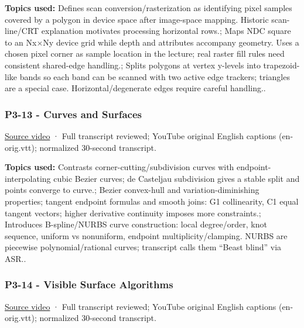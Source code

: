 \textbf{Topics used:} Defines scan conversion/rasterization as identifying pixel samples covered by a polygon in device space after image-space mapping. Historic scan-line/CRT explanation motivates processing horizontal rows.; Maps NDC square to an Nx×Ny device grid while depth and attributes accompany geometry. Uses a chosen pixel corner as sample location in the lecture; real raster fill rules need consistent shared-edge handling.; Splits polygons at vertex y-levels into trapezoid-like bands so each band can be scanned with two active edge trackers; triangles are a special case. Horizontal/degenerate edges require careful handling..

\subsubsection{P3-13 - Curves and Surfaces}\label{04-visual-computing-ii-ch036-p3-13---curves-and-surfaces}

\href{https://www.youtube.com/watch?v=FTg1DUr7bhY}{Source video} · Full transcript reviewed; YouTube original English captions (en-orig.vtt); normalized 30-second transcript.

\textbf{Topics used:} Contrasts corner-cutting/subdivision curves with endpoint-interpolating cubic Bezier curves; de Casteljau subdivision gives a stable split and points converge to curve.; Bezier convex-hull and variation-diminishing properties; tangent endpoint formulas and smooth joins: G1 collinearity, C1 equal tangent vectors; higher derivative continuity imposes more constraints.; Introduces B-spline/NURBS curve construction: local degree/order, knot sequence, uniform vs nonuniform, endpoint multiplicity/clamping. NURBS are piecewise polynomial/rational curves; transcript calls them ``Beast blind'' via ASR..

\subsubsection{P3-14 - Visible Surface Algorithms}\label{04-visual-computing-ii-ch036-p3-14---visible-surface-algorithms}

\href{https://www.youtube.com/watch?v=hmlWFi1TdbI}{Source video} · Full transcript reviewed; YouTube original English captions (en-orig.vtt); normalized 30-second transcript.

